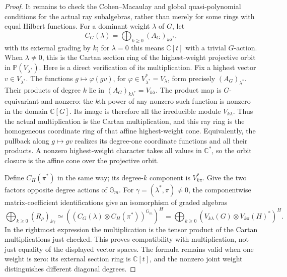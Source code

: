 \begin{proof}
It remains to check the Cohen--Macaulay and global quasi-polynomial
conditions for the actual ray subalgebras, rather than merely for
some rings with equal Hilbert functions. For a dominant weight
$\lambda$ of $G$, let
\[
 C_G(\lambda)=\bigoplus_{k\ge0}(A_G)_{k\lambda^*},
\]
with its external grading by $k$; for $\lambda=0$ this means
$\mathbb C[t]$ with a trivial $G$-action. When $\lambda\ne0$,
this is the Cartan section ring of the highest-weight projective
orbit in $\mathbb P(V_{\lambda^*})$. Here is a direct verification
of its multiplication. Fix a highest vector $v\in V_{\lambda^*}$.
The functions $g\mapsto\varphi(gv)$, for
$\varphi\in V_{\lambda^*}^*=V_\lambda$, form precisely
$(A_G)_{\lambda^*}$. Their products of degree $k$ lie in
$(A_G)_{k\lambda^*}=V_{k\lambda}$. The product map is $G$-equivariant
and nonzero: the $k$th power of any nonzero such function is nonzero
in the domain $\mathbb C[G]$. Its image is therefore all the
irreducible module $V_{k\lambda}$. Thus the actual multiplication
is the Cartan multiplication, and this ray ring is the homogeneous
coordinate ring of that affine highest-weight cone. Equivalently,
the pullback along $g\mapsto gv$ realizes its degree-one coordinate
functions and all their products. A nonzero highest-weight character
takes all values in $\mathbb C^*$, so the orbit closure is the
affine cone over the projective orbit.

Define $C_H(\pi^*)$ in the same way; its degree-$k$ component is
$V_{k\pi}^*$. Give the two factors opposite degree actions of
$\mathbb G_m$. For $\gamma=(\lambda^*,\pi)\ne0$, the componentwise
matrix-coefficient identifications give an isomorphism of graded
algebras
\[
 \bigoplus_{k\ge0}(R_\rho)_{k\gamma}
 \simeq
 \left((C_G(\lambda)\otimes C_H(\pi^*))^{\mathbb G_m}\right)^H
 =\bigoplus_{k\ge0}
      (V_{k\lambda}(G)\otimes V_{k\pi}(H)^*)^H.
 \tag{P-F17e}
\]
In the rightmost expression the multiplication is the tensor product
of the Cartan multiplications just checked. This proves compatibility
with multiplication, not just equality of the displayed vector spaces.
The formula remains valid when one weight is zero: its external
section ring is $\mathbb C[t]$, and the nonzero joint weight
distinguishes different diagonal degrees.


\end{proof}
